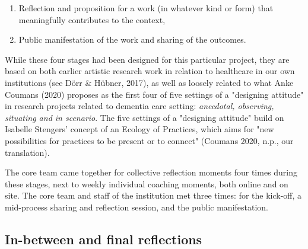 \documentclass[authordate, empirical]{jote-new-article}
\begin{document}
{\begin{enumerate}
		\item Reflection and proposition for a work (in whatever kind or form) that meaningfully contributes to the context,



		\item Public manifestation of the work and sharing of the outcomes.


	\end{enumerate}





	While these four stages had been designed for this particular project, they are based on both earlier artistic research work in relation to healthcare in our own institutions (see Dörr \& Hübner, 2017), as well as loosely related to what Anke Coumans (2020) proposes as the first four of five settings of a "designing attitude" in research projects related to dementia care setting: \emph{anecdotal, observing, situating and in scenario}. The five settings of a "designing attitude" build on Isabelle Stengers' concept of an Ecology of Practices, which aims for "new possibilities for practices to be present or to connect" (Coumans 2020, n.p., our translation).



	The core team came together for collective reflection moments four times during these stages, next to weekly individual coaching moments, both online and on site. The core team and staff of the institution met three times: for the kick-off, a mid-process sharing and reflection session, and the public manifestation.



	}



	\subsection{In-between and final reflections}
\end{document}

